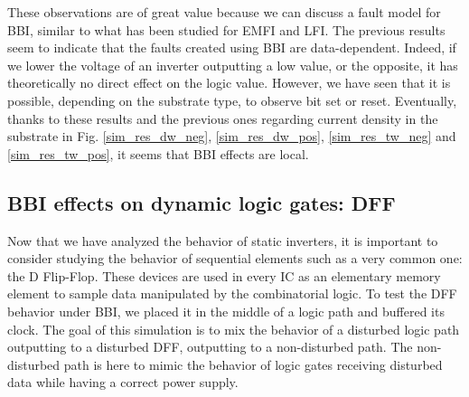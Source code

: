 	These observations are of great value because we can discuss a fault model for BBI, similar to what has been studied for EMFI and LFI.
	The previous results seem to indicate that the faults created using BBI are data-dependent.
	Indeed, if we lower the voltage of an inverter outputting a low value, or the opposite, it has theoretically no direct effect on the logic value.
	However, we have seen that it is possible, depending on the substrate type, to observe bit set or reset.
	Eventually, thanks to these results and the previous ones regarding current density in the substrate in Fig. \ref{sim_res_dw_neg}, \ref{sim_res_dw_pos}, \ref{sim_res_tw_neg} and \ref{sim_res_tw_pos}, it seems that BBI effects are local.

\subsection{BBI effects on dynamic logic gates: DFF}
	
	Now that we have analyzed the behavior of static inverters, it is important to consider studying the behavior of sequential elements such as a very common one: the D Flip-Flop.
	These devices are used in every IC as an elementary memory element to sample data manipulated by the combinatorial logic.
	To test the DFF behavior under BBI, we placed it in the middle of a logic path and buffered its clock.
	The goal of this simulation is to mix the behavior of a disturbed logic path outputting to a disturbed DFF, outputting to a non-disturbed path.
	The non-disturbed path is here to mimic the behavior of logic gates receiving disturbed data while having a correct power supply.

